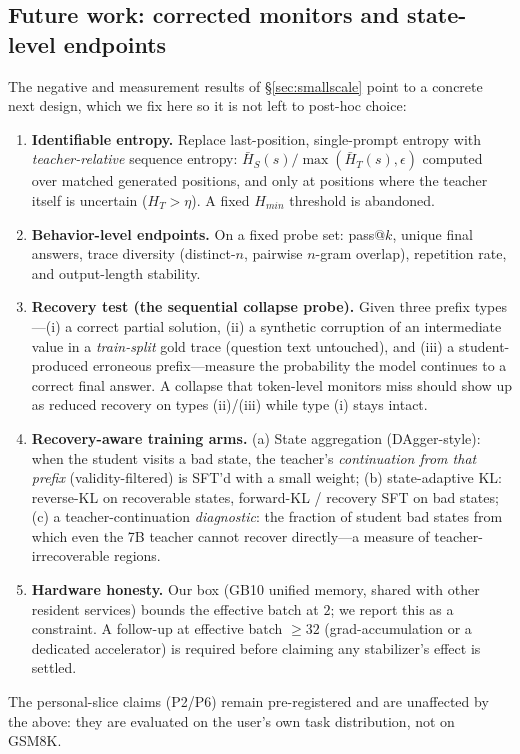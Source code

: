 \documentclass[11pt]{article}
\begin{document}
\subsection{Future work: corrected monitors and state-level endpoints}
\label{sec:future}
The negative and measurement results of \S\ref{sec:smallscale} point to a concrete next design, which we fix here so it is not left to post-hoc choice:
\begin{enumerate}
  \item \textbf{Identifiable entropy.} Replace last-position, single-prompt entropy with \emph{teacher-relative} sequence entropy: $\bar H_S(s)/\max(\bar H_T(s),\epsilon)$ computed over matched generated positions, and only at positions where the teacher itself is uncertain ($H_T>\eta$). A fixed $H_{min}$ threshold is abandoned.
  \item \textbf{Behavior-level endpoints.} On a fixed probe set: pass@$k$, unique final answers, trace diversity (distinct-$n$, pairwise $n$-gram overlap), repetition rate, and output-length stability.
  \item \textbf{Recovery test (the sequential collapse probe).} Given three prefix types---(i) a correct partial solution, (ii) a synthetic corruption of an intermediate value in a \emph{train-split} gold trace (question text untouched), and (iii) a student-produced erroneous prefix---measure the probability the model continues to a correct final answer. A collapse that token-level monitors miss should show up as reduced recovery on types (ii)/(iii) while type (i) stays intact.
  \item \textbf{Recovery-aware training arms.} (a) State aggregation (DAgger-style): when the student visits a bad state, the teacher's \emph{continuation from that prefix} (validity-filtered) is SFT'd with a small weight; (b) state-adaptive KL: reverse-KL on recoverable states, forward-KL / recovery SFT on bad states; (c) a teacher-continuation \emph{diagnostic}: the fraction of student bad states from which even the 7B teacher cannot recover directly---a measure of teacher-irrecoverable regions.
  \item \textbf{Hardware honesty.} Our box (GB10 unified memory, shared with other resident services) bounds the effective batch at $2$; we report this as a constraint. A follow-up at effective batch $\ge 32$ (grad-accumulation or a dedicated accelerator) is required before claiming any stabilizer's effect is settled.
\end{enumerate}
The personal-slice claims (P2/P6) remain pre-registered and are unaffected by the above: they are evaluated on the user's own task distribution, not on GSM8K.
\end{document}
